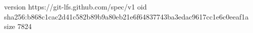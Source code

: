 version https://git-lfs.github.com/spec/v1
oid sha256:b868c1cac2d41c582b89b9a80eb21e6f64837743ba3edac9617cc1e6c0eeaf1a
size 7824
